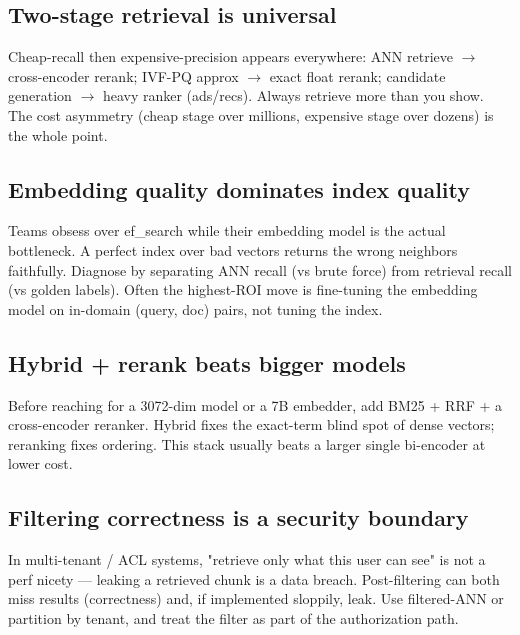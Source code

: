 \documentclass[11pt]{article}
\begin{document}
\subsection{Two-stage retrieval is universal}\label{two-stage-retrieval-is-universal}

Cheap-recall then expensive-precision appears everywhere: ANN retrieve \(\rightarrow\) cross-encoder rerank; IVF-PQ approx \(\rightarrow\) exact float rerank; candidate generation \(\rightarrow\) heavy ranker (ads/recs). Always retrieve more than you show. The cost asymmetry (cheap stage over millions, expensive stage over dozens) is the whole point.

\subsection{Embedding quality dominates index quality}\label{embedding-quality-dominates-index-quality}

Teams obsess over ef\_search while their embedding model is the actual bottleneck. A perfect index over bad vectors returns the wrong neighbors faithfully. Diagnose by separating ANN recall (vs brute force) from retrieval recall (vs golden labels). Often the highest-ROI move is fine-tuning the embedding model on in-domain (query, doc) pairs, not tuning the index.

\subsection{Hybrid + rerank beats bigger models}\label{hybrid--rerank-beats-bigger-models}

Before reaching for a 3072-dim model or a 7B embedder, add BM25 + RRF + a cross-encoder reranker. Hybrid fixes the exact-term blind spot of dense vectors; reranking fixes ordering. This stack usually beats a larger single bi-encoder at lower cost.

\subsection{Filtering correctness is a security boundary}\label{filtering-correctness-is-a-security-boundary}

In multi-tenant / ACL systems, "retrieve only what this user can see" is not a perf nicety --- leaking a retrieved chunk is a data breach. Post-filtering can both miss results (correctness) and, if implemented sloppily, leak. Use filtered-ANN or partition by tenant, and treat the filter as part of the authorization path.
\end{document}
